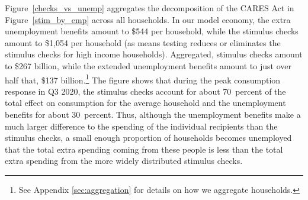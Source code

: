 \documentclass[titlepage,a4paper]{\econtex}
\begin{document}
Figure~\ref{checks_vs_unemp} aggregates the decomposition of the CARES Act in Figure~\ref{stim_by_emp} across all households.
In our model economy, the extra unemployment benefits amount to \$544 per household, while the stimulus checks amount to \$1,054 per household (as means testing reduces or eliminates the stimulus checks for high income households).
Aggregated, stimulus checks amount to \$267 billion, while the extended unemployment benefits amount to just over half that, \$137 billion.\footnote{See Appendix \ref{sec:aggregation} for details on how we aggregate households.}
The figure shows that during the peak consumption response in Q3 2020, the stimulus checks account for about 70~percent of the total effect on consumption for the average household and the unemployment benefits for about 30~percent.  Thus, although the unemployment benefits make a much larger difference to the spending of the individual recipients than the stimulus checks, a small enough proportion of households becomes unemployed that the total extra spending coming from these people is less than the total extra spending from the more widely distributed stimulus checks.
\end{document}
